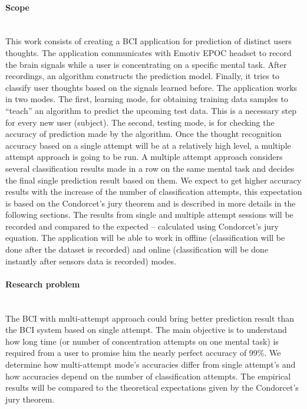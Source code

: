 \documentclass[12pt]{article}
\theoremstyle{definition}
\begin{document}
\paragraph{Scope}~\\

This work consists of creating a BCI application for prediction of distinct users thoughts. The application communicates with Emotiv EPOC headset \cite{emotiv} to record the brain signals while a user is concentrating on a specific mental task. After recordings, an algorithm constructs the prediction model. Finally, it tries to classify user thoughts based on the signals learned before. The application works in two modes. The first, learning mode, for obtaining training data samples to ``teach'' an algorithm to predict the upcoming test data. This is a necessary step for every new user (subject). The second, testing mode, is for checking the accuracy of prediction made by the algorithm. Once the thought recognition accuracy based on a single attempt will be at a relatively high level, a multiple attempt approach is going to be run. A multiple attempt approach considers several classification results made in a row on the same mental task and decides the final single prediction result based on them. We expect to get higher accuracy results with the increase of the number of classification attempts, this expectation is based on the Condorcet's jury theorem and is described in more details in the following sections. The results from single and multiple attempt sessions will be recorded and compared to the expected -- calculated using Condorcet's jury equation. The application will be able to work in offline (classification will be done after the dataset is recorded) and online (classification will be done instantly after sensors data is recorded) modes.
\paragraph{Research problem}~\\

The BCI with multi-attempt approach could bring better prediction result than the BCI system based on single attempt. The main objective is to understand how long time (or number of concentration attempts on one mental task) is required from a user to promise him the nearly perfect accuracy of 99\%. We determine how multi-attempt mode's accuracies differ from single attempt's and how accuracies depend on the number of classification attempts. The empirical results will be compared to the theoretical expectations given by the Condorcet's jury theorem.
\end{document}
